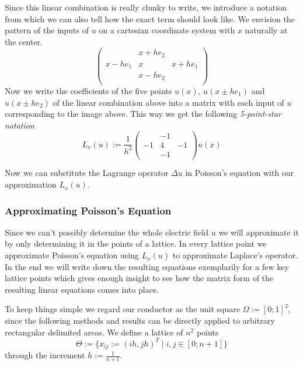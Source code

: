 Since this linear combination is really clunky to write, we introduce a notation from which we can also tell how the exact term should look like.
We envision the pattern of the inputs of \(u\) on a cartesian coordinate system with \(x\) naturally at the center.
\[\begin{pmatrix} & x + he_2 & \\ x - he_1 & x & x + he_1 \\ & x - he_2 & \\\end{pmatrix}\]
Now we write the coefficients of the five points \(u(x)\), \(u(x \pm he_1)\) and \(u(x \pm he_2)\) of the linear combination above into a matrix with each input of \(u\) corresponding to the image above.
This way we get the following \emph{5-point-star notation}
\[L_x(u) := \frac{1}{h^2} \begin{pmatrix} & -1 & \\-1 & 4 & -1\\ & -1 & \end{pmatrix} u(x)\]

Now we can substitute the Lagrange operator \(\Delta u\) in Poisson's equation with our approximation \(L_x(u)\).

\subsubsection{Approximating Poisson's Equation}
Since we can't possibly determine the whole electric field \(u\) we will approximate it by only determining it in the points of a lattice.
In every lattice point we approximate Poisson's equation using \(L_x(u)\) to approximate Laplace's operator.
In the end we will write down the resulting equations exemplarily for a few key lattice points which gives enough insight to see how the matrix form of the resulting linear equations comes into place.

To keep things simple we regard our conductor as the unit square \(\Omega := [0; 1]^2\), since the following methods and results can be directly applied to arbitrary rectangular delimited areas.
We define a lattice of \(n^2\) points
\[\Theta := \{x_{ij} := (ih, jh)^T \mid i, j \in [0;n+1]\}\]
through the increment \(h := \frac{1}{n+1}\).

\begin{center}
   
\end{center}

